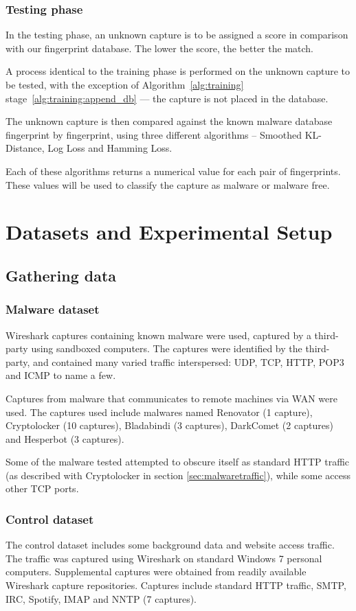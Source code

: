 \documentclass[9pt,journal,compsoc]{IEEEtran}
\begin{document}
\subsubsection{Testing phase}
In the testing phase, an unknown capture is to be assigned a score in comparison with our fingerprint database. The lower the score, the better the match.

A process identical to the training phase is performed on the unknown capture to be tested, with the exception of Algorithm~\ref{alg:training} stage~\ref{alg:training:append_db} --- the capture is not placed in the database.
 
The unknown capture is then compared against the known malware database fingerprint by fingerprint, using three different algorithms – Smoothed KL-Distance, Log Loss and Hamming Loss.

Each of these algorithms returns a numerical value for each pair of fingerprints. These values will be used to classify the capture as malware or malware free.
\section{Datasets and Experimental Setup}
\subsection{Gathering data}
\subsubsection{Malware dataset}
Wireshark captures containing known malware were used, captured by a third-party using sandboxed computers.
The captures were identified by the third-party, and contained many varied traffic interspersed: UDP, TCP, HTTP, POP3 and ICMP to name a few.

Captures from malware that communicates to remote machines via WAN were used.
The captures used include malwares named Renovator (1 capture),  Cryptolocker (10 captures), Bladabindi (3 captures), DarkComet (2 captures) and Hesperbot (3 captures).

Some of the malware tested attempted to obscure itself as standard HTTP traffic (as described with Cryptolocker in section \ref{sec:malwaretraffic}), while some access other TCP ports.
\subsubsection{Control dataset}
The control dataset includes some background data and website access traffic.
The traffic was captured using Wireshark on standard Windows 7 personal computers. Supplemental captures were obtained from readily available Wireshark capture repositories.
Captures include standard HTTP traffic, SMTP, IRC, Spotify, IMAP and NNTP (7 captures).
\end{document}
